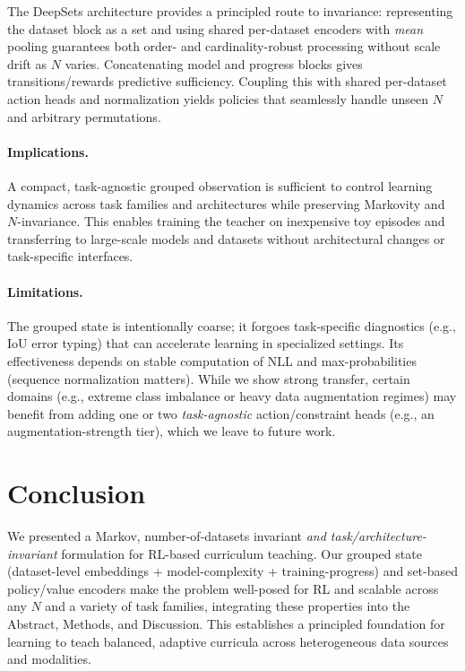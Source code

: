 \documentclass[11pt]{article}
\newcommand{\1}{\mathbf{1}}
\begin{document}
The DeepSets architecture provides a principled route to invariance: representing the dataset block as a set and using shared per-dataset encoders with \emph{mean} pooling guarantees both order- and cardinality-robust processing without scale drift as $N$ varies. Concatenating model and progress blocks gives transitions/rewards predictive sufficiency. Coupling this with shared per-dataset action heads and normalization yields policies that seamlessly handle unseen $N$ and arbitrary permutations.

\paragraph{Implications.}
A compact, task-agnostic grouped observation is sufficient to control learning dynamics across task families and architectures while preserving Markovity and $N$-invariance.
This enables training the teacher on inexpensive toy episodes and transferring to large-scale models and datasets without architectural changes or task-specific interfaces.

\paragraph{Limitations.}
The grouped state is intentionally coarse; it forgoes task-specific diagnostics (e.g., IoU error typing) that can accelerate learning in specialized settings.
Its effectiveness depends on stable computation of NLL and max-probabilities (sequence normalization matters).
While we show strong transfer, certain domains (e.g., extreme class imbalance or heavy data augmentation regimes) may benefit from adding one or two \emph{task-agnostic} action/constraint heads (e.g., an augmentation-strength tier), which we leave to future work.

\section{Conclusion}
We presented a Markov, number-of-datasets invariant \emph{and task/architecture-invariant} formulation for RL-based curriculum teaching.
Our grouped state (dataset-level embeddings + model-complexity + training-progress) and set-based policy/value encoders make the problem well-posed for RL and scalable across any $N$ and a variety of task families, integrating these properties into the Abstract, Methods, and Discussion.
This establishes a principled foundation for learning to teach balanced, adaptive curricula across heterogeneous data sources and modalities.
\end{document}

